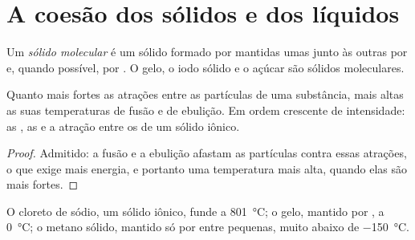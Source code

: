 \section{A coesão dos sólidos e dos líquidos}

\begin{definition}\label{def:g11:polarity-and-cohesion:molecular-solid}
Um \emph{sólido molecular} é um sólido formado por
 mantidas umas junto às outras por 
e, quando possível, por . O gelo, o iodo sólido e
o açúcar são sólidos moleculares.
\end{definition}

\begin{proposition}\label{prop:g11:polarity-and-cohesion:cohesion}
Quanto mais fortes as atrações entre as partículas de uma substância,
mais altas as suas temperaturas de fusão e de ebulição. Em ordem
crescente de intensidade: as , as  e a atração entre os  de um sólido iônico.
\end{proposition}

\begin{proof}
Admitido: a fusão e a ebulição afastam as partículas contra essas
atrações, o que exige mais energia, e portanto uma temperatura mais alta,
quando elas são mais fortes.
\end{proof}

\begin{example}\label{ex:g11:polarity-and-cohesion:three}
O cloreto de sódio, um sólido iônico, funde a \qty{801}{\celsius}; o
gelo, mantido por , a \qty{0}{\celsius}; o metano
sólido, mantido só por  entre 
pequenas, muito abaixo de \qty{-150}{\celsius}.
\end{example}

